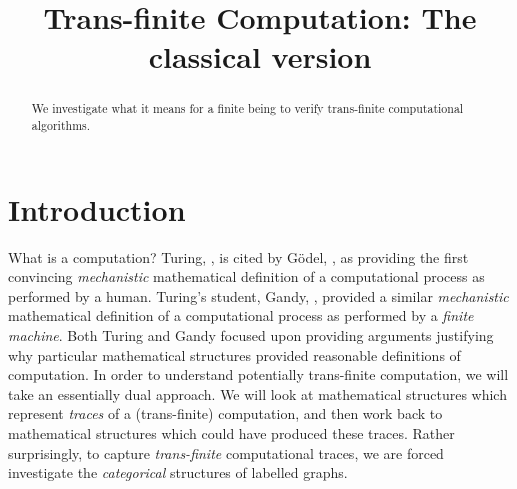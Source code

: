 \documentclass[a4paper,openany]{amsart}
\begin{document}
\sloppy

\title[Computation: Classical version]{Trans-finite Computation: The classical version}

%

\begin{abstract}
We investigate what it means for a finite being to verify trans-finite computational
algorithms.
\end{abstract} 
\maketitle 
\tableofcontents 


\section{Introduction}

What is a computation? Turing, \cite{turing1936computableNumbersMachines}, is cited by
G\"odel, \cite{godel}, as providing the first convincing \emph{mechanistic} mathematical
definition of a computational process as performed by a human. Turing's student, Gandy,
\cite{gandy1980churchsThesisMechanisms}, provided a similar \emph{mechanistic}
mathematical definition of a computational process as performed by a \emph{finite
machine}. Both Turing and Gandy focused upon providing arguments justifying why particular
mathematical structures provided reasonable definitions of computation. In order to
understand potentially trans-finite computation, we will take an essentially dual
approach. We will look at mathematical structures which represent \emph{traces} of a
(trans-finite) computation, and then work back to mathematical structures which could have
produced these traces. Rather surprisingly, to capture \emph{trans-finite} computational
traces, we are forced investigate the \emph{categorical} structures of labelled graphs.
\end{document}
